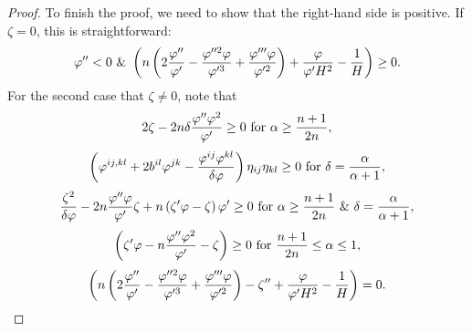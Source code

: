 \documentclass{amsart}
\begin{document}
\begin{proof}
To finish the proof, we need to show that the right-hand side is positive. If $\zeta=0$, this is straightforward:
\[\varphi''<0~\&~\left(n\left(2\frac{\varphi''}{\varphi'}-\frac{\varphi''^{2}\varphi}{\varphi'^{3}}+\frac{\varphi'''\varphi}{\varphi'^{2}}\right)+\frac{\varphi}{\varphi'H^2}-\frac{1}{H}\right)\geq 0.\]
For the second case that $\zeta\neq 0$, note that
$$2\zeta-2n\delta\frac{\varphi''\varphi^2}{\varphi'}\geq 0~\mbox{for}~\alpha\geq \frac{n+1}{2n},$$ 
$$\left(\varphi^{ij,kl}+2b^{il}\varphi^{jk}-\frac{\varphi^{ij}\varphi^{kl}}{\delta\varphi}\right)\eta_{ij}\eta_{kl}\geq0~\mbox{for}~\delta=\frac{\alpha}{\alpha+1},$$
$$\frac{\zeta^2}{\delta\varphi}-2n\frac{\varphi''\varphi}{\varphi'}\zeta+n\left(\zeta'\varphi-\zeta\right)\varphi'\geq 0~\mbox{for}~\alpha\geq\frac{n+1}{2n}~\&~\delta=\frac{\alpha}{\alpha+1},$$
$$\left(\zeta'\varphi-n\frac{\varphi''\varphi^2}{\varphi'}-\zeta\right)\geq 0~\mbox{for}~\frac{n+1}{2n}\leq \alpha\leq 1,$$
$$\left(n\left(2\frac{\varphi''}{\varphi'}-\frac{\varphi''^{2}\varphi}{\varphi'^{3}}+\frac{\varphi'''\varphi}{\varphi'^{2}}\right)-\zeta''+\frac{\varphi}{\varphi'H^2}-\frac{1}{H}\right)=0.$$
\end{proof}






\end{document}
